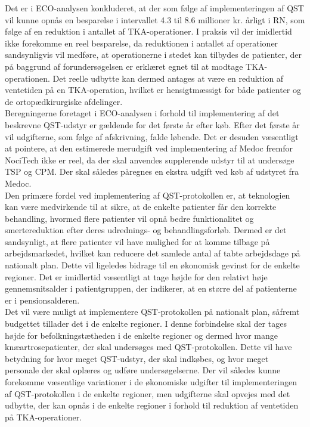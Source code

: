 Det er i ECO-analysen konkluderet, at der som følge af implementeringen af QST vil kunne opnås en besparelse i intervallet 4.3 til 8.6 millioner kr. årligt i RN, som følge af en reduktion i antallet af TKA-operationer. I praksis vil der imidlertid ikke forekomme en reel besparelse, da reduktionen i antallet af operationer sandsynligvis vil medføre, at operationerne i stedet kan tilbydes de patienter, der på baggrund af forundersøgelsen er erklæret egnet til at modtage TKA-operationen. Det reelle udbytte kan dermed antages at være en reduktion af ventetiden på en TKA-operation, hvilket er hensigtmæssigt for både patienter og de ortopædkirurgiske afdelinger.\\
Beregningerne foretaget i ECO-analysen i forhold til implementering af det beskrevne QST-udstyr er gældende for det første år efter køb. Efter det første år vil udgifterne, som følge af afskrivning, falde løbende. Det er desuden væsentligt at pointere, at den estimerede merudgift ved implementering af Medoc fremfor NociTech ikke er reel, da der skal anvendes supplerende udstyr til at undersøge TSP og CPM. Der skal således påregnes en ekstra udgift ved køb af udstyret fra Medoc. \\
Den primære fordel ved implementering af QST-protokollen er, at teknologien kan være medvirkende til at sikre, at de enkelte patienter får den korrekte behandling, hvormed flere patienter vil opnå bedre funktionalitet og smertereduktion efter deres udrednings- og behandlingsforløb. Dermed er det sandsynligt, at flere patienter vil have mulighed for at komme tilbage på arbejdsmarkedet, hvilket kan reducere det samlede antal af tabte arbejdsdage på nationalt plan. Dette vil ligeledes bidrage til en økonomisk gevinst for de enkelte regioner. Det er imidlertid væsentligt at tage højde for den relativt høje gennemsnitsalder i patientgruppen, der indikerer, at en større del af patienterne er i pensionsalderen. \\
Det vil være muligt at implementere QST-protokollen på nationalt plan, såfremt budgettet tillader det i de enkelte regioner. I denne forbindelse skal der tages højde for befolkningstætheden i de enkelte regioner og dermed hvor mange knæartrosepatienter, der skal undersøges med QST-protokollen. Dette vil have betydning for hvor meget QST-udstyr, der skal indkøbes, og hvor meget personale der skal oplæres og udføre undersøgelserne. Der vil således kunne forekomme væsentlige variationer i de økonomiske udgifter til implementeringen af QST-protokollen i de enkelte regioner, men udgifterne skal opvejes med det udbytte, der kan opnås i de enkelte regioner i forhold til reduktion af ventetiden på TKA-operationer.

